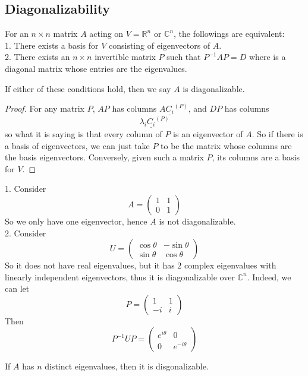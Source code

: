 \subsection{Diagonalizability}
\begin{proposition}
    For an $n\times n$ matrix $A$ acting on $V=\mathbb R^n$ or $\mathbb C^n$, the followings are equivalent:\\
    1. There exists a basis for $V$ consisting of eigenvectors of $A$.\\
    2. There exists an $n\times n$ invertible matrix $P$ such that $P^{-1}AP=D$ where is a diagonal matrix whose entries are the eigenvalues.
\end{proposition}
If either of these conditions hold, then we say $A$ is diagonalizable.
\begin{proof}
    For any matrix $P$, $AP$ has columns $A\underline{C_i}^{(P)}$, and $DP$ has columns
    $$\lambda_i\underline{C_i}^{(P)}$$
    so what it is saying is that every column of $P$ is an eigenvector of $A$.
    So if there is a basis of eigenvectors, we can just take $P$ to be the matrix whose columns are the basis eigenvectors.
    Conversely, given such a matrix $P$, its columns are a basis for $V$.
\end{proof}
\begin{example}
    1. Consider
    $$A=
    \begin{pmatrix}
        1&1\\
        0&1
    \end{pmatrix}$$
    So we only have one eigenvector, hence $A$ is not diagonalizable.\\
    2. Consider
    $$U=
    \begin{pmatrix}
        \cos\theta&-\sin\theta\\
        \sin\theta&\cos\theta
    \end{pmatrix}$$
    So it does not have real eigenvalues, but it has $2$ complex eigenvalues with linearly independent eigenvectors, thus it is diagonalizable over $\mathbb C^n$.
    Indeed, we can let
    $$P=
    \begin{pmatrix}
        1&1\\
        -i&i
    \end{pmatrix}$$
    Then
    $$P^{-1}UP=\begin{pmatrix}
        e^{i\theta}&0\\
        0&e^{-i\theta}
    \end{pmatrix}$$
\end{example}
\begin{proposition}
    If $A$ has $n$ distinct eigenvalues, then it is disgonalizable.
\end{proposition}
